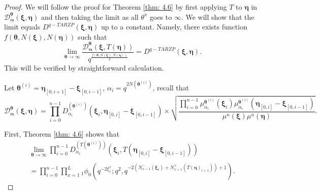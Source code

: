 \documentclass{ximera}
\begin{document}
\begin{proof}
 We will follow the proof for Theorem \ref{thm: 4.6} by first applying $T$ to $\boldsymbol\eta$ in $\mathcal{D}_{\boldsymbol{\alpha}}^{\boldsymbol{\theta}}(\boldsymbol\xi,\boldsymbol\eta)$ and then taking the limit as all $\theta^x$ goes to $\infty$. We will show that the limit  equals $D^{q-TARZP}(\boldsymbol\xi,\boldsymbol\eta)$ up to a constant. Namely, there exists function $f(\boldsymbol\theta,N(\boldsymbol\xi),N(\boldsymbol\eta))$ such that 
\begin{equation*}
    \lim_{\boldsymbol\theta\xrightarrow{}\infty} \frac{\mathcal{D}_{\boldsymbol{\alpha}}^{\boldsymbol{\theta}}(\boldsymbol\xi,T(\boldsymbol\eta)) }{q^{\frac{f(\boldsymbol\theta,N(\boldsymbol\xi),N(\boldsymbol\eta))}{2}}} = D^{q-TARZP}(\boldsymbol\xi,\boldsymbol\eta).
\end{equation*}
This will be verified by straightforward calculation.

 Let $\boldsymbol\theta^{(i)}=\boldsymbol\eta_{[0,i+1]}-\boldsymbol\xi_{[0,i-1]}$, $\alpha_i=q^{2N(\boldsymbol\theta^{(i)})}$,
recall that 
\begin{equation*}
\mathcal{D}_{\boldsymbol{\alpha}}^{\boldsymbol{\theta}}(\boldsymbol\xi,\boldsymbol\eta)=\prod_{i=0}^{n-1} D_{\alpha_i}^{(\boldsymbol\theta^{(i)})}(\boldsymbol\xi_i,\boldsymbol\eta_{[0,i]}-\boldsymbol\xi_{[0,i-1]}) 
    \times \sqrt{\frac{\prod_{i=0}^{n-1}\mu_{\alpha_i}^{\boldsymbol\theta^{(i)}}(\boldsymbol\xi_i)\mu_{\alpha_i}^{\boldsymbol\theta^{(i)}}(\boldsymbol\eta_{[0,i]}-\boldsymbol\xi_{[0,i-1]})}{\mu^n(\boldsymbol\xi) \mu^n(\boldsymbol\eta)}}.
\end{equation*}

First, Theorem \ref{thm: 4.6} shows that 
\begin{multline*}
    \lim_{\boldsymbol\theta\xrightarrow[]{}\infty}\prod_{i=0}^{n-1} D_{\alpha_i}^{(T(\boldsymbol\theta^{(i)}))}(\boldsymbol\xi_i,T(\boldsymbol\eta_{[0,i]}-\boldsymbol\xi_{[0,i-1]}))\\
= \prod_{i=0}^{n-1}\prod_{x=1}^L{}_1\phi_0\left(q^{-2\xi_i^x};q^2,q^{-2\left(N_{x-1}^-(\boldsymbol\xi_i)+N_{x+1}^+(T(\boldsymbol\eta)_{i+1})\right)+1}\right). 
\end{multline*}

 


\end{proof}
\end{document}
